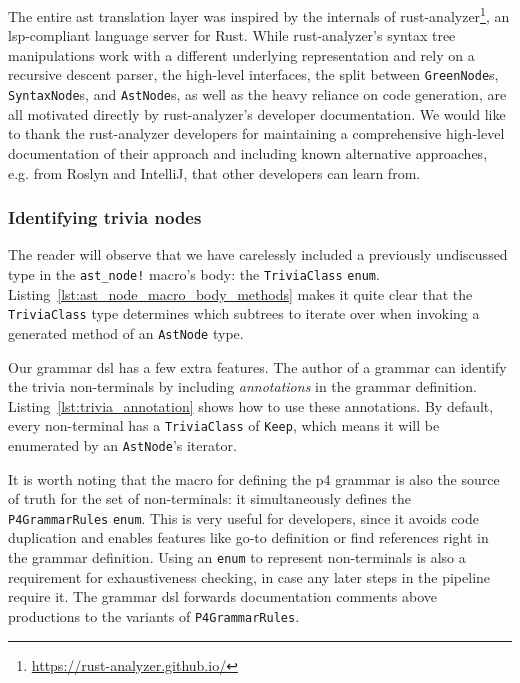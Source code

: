 The entire \acrshort{ast} translation layer was inspired by the internals of
rust-analyzer\footnote{\url{https://rust-analyzer.github.io/}}, an
\acrshort{lsp}-compliant language server for Rust. While rust-analyzer's syntax
tree manipulations work with a different underlying representation and rely on a
recursive descent parser, the high-level interfaces, the split between
\texttt{GreenNode}s, \texttt{SyntaxNode}s, and \texttt{AstNode}s, as well as the
heavy reliance on code generation, are all motivated directly by rust-analyzer's
developer documentation. We would like to thank the rust-analyzer developers for
maintaining a comprehensive high-level documentation of their approach and
including known alternative approaches, e.g. from Roslyn and IntelliJ, that
other developers can learn from.

\subsubsection*{Identifying trivia nodes}

The reader will observe that we have carelessly included a previously
undiscussed type in the \texttt{ast\_node!} macro's body: the
\texttt{TriviaClass} \texttt{enum}.
Listing~\ref{lst:ast_node_macro_body_methods} makes it quite clear that the
\texttt{TriviaClass} type determines which subtrees to iterate over when
invoking a generated method of an \texttt{AstNode} type.

Our grammar \acrshort{dsl} has a few extra features. The author of a grammar can
identify the trivia non-terminals by including \emph{annotations} in the grammar
definition. Listing~\ref{lst:trivia_annotation} shows how to use these
annotations. By default, every non-terminal has a \texttt{TriviaClass} of
\texttt{Keep}, which means it will be enumerated by an \texttt{AstNode}'s
iterator.

It is worth noting that the macro for defining the \acrshort{p4} grammar is also
the source of truth for the set of non-terminals: it simultaneously defines the
\texttt{P4GrammarRules} \texttt{enum}. This is very useful for developers, since
it avoids code duplication and enables features like go-to definition or find
references right in the grammar definition. Using an \texttt{enum} to represent
non-terminals is also a requirement for exhaustiveness checking, in case any
later steps in the pipeline require it. The grammar \acrshort{dsl} forwards
documentation comments above productions to the variants of
\texttt{P4GrammarRules}.

